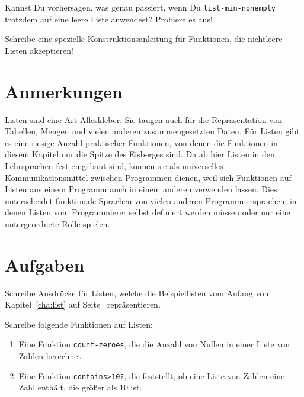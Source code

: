 \begin{aufgabeinline}
  Kannst Du vorhersagen, was genau passiert, wenn Du
  \lstinline{list-min-nonempty} trotzdem auf eine leere Liste
  anwendest?  Probiere es aus!
\end{aufgabeinline}

\begin{aufgabeinline}
  Schreibe eine spezielle Konstruktionsanleitung für Funktionen, die
  nichtleere Listen akzeptieren!
\end{aufgabeinline}

\section*{Anmerkungen}

Listen sind eine Art Alleskleber:
Sie taugen auch für die Repräsentation von Tabellen,
Mengen und vielen anderen zusammengesetzten Daten.  Für Listen gibt es
eine riesige Anzahl praktischer Funktionen, von denen die Funktionen in
diesem Kapitel nur die Spitze des Eisberges sind.  Da 
ab hier Listen in den Lehrsprachen fest eingebaut sind, können sie als universelles
Kommunikationsmittel zwischen Programmen dienen, weil sich Funktionen
auf Listen aus einem Programm auch in einem anderen verwenden lassen.
Dies unterscheidet funktionale Sprachen von vielen anderen Programmiersprachen, in
denen Listen vom Programmierer selbst definiert werden müssen oder nur
eine untergeordnete Rolle spielen.

\section*{Aufgaben}

\begin{aufgabe}
  Schreibe Ausdrücke für Listen, welche die Beispiellisten vom
  Anfang von Kapitel~\ref{cha:list} auf Seite~\pageref{cha:list} repräsentieren.
\end{aufgabe}

\begin{aufgabe}
Schreibe folgende Funktionen auf Listen:
  
  \begin{enumerate} 
    
  \item Eine Funktion \lstinline{count-zeroes}, die die Anzahl von Nullen
    in einer Liste von Zahlen berechnet.
    
  \item Eine Funktion \lstinline{contains>10?}, die feststellt, ob eine
    Liste von Zahlen eine Zahl enthält, die größer als 10 ist.
  \end{enumerate}
  
\end{aufgabe}

